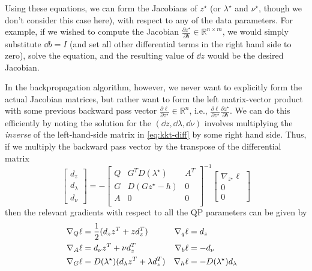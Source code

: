 Using these equations, we can form the Jacobians of $z^\star$ (or
$\lambda^\star$ and $\nu^\star$, though we don't consider this case here), with
respect to any of the data parameters.  For example, if we wished to compute the
Jacobian $\frac{\partial z^\star}{\partial b} \in \mathbb{R}^{n \times m}$, we
would simply substitute $\dd b = I$ (and set all other differential terms in
the right hand side to zero), solve the equation, and the resulting value of
$\dd z$ would be the desired Jacobian.

In the backpropagation algorithm, however, we never want to explicitly form the
actual Jacobian matrices, but rather want to form the left matrix-vector product
with some previous backward pass vector $\frac{\partial \ell}{\partial z^\star}
    \in \mathbb{R}^n$, i.e., $\frac{\partial \ell}{\partial z^\star} \frac {\partial
        z^\star}{\partial b}$.   We can do this efficiently by noting the
solution for the $(\dd z, \dd \lambda, \dd \nu)$ involves multiplying the \emph
{inverse} of the left-hand-side matrix in \eqref{eq:kkt-diff} by some right hand
side.  Thus, if we multiply the backward pass vector by the transpose of the
differential matrix
\begin{equation}
    \label{eq-d-def}
    \begin{bmatrix}
        d_z \\ d_\lambda \\ d_\nu
    \end{bmatrix}
    =
    -
    \begin{bmatrix}
        Q & G^T D(\lambda^\star) & A^T \\
        G & D(Gz^\star-h)        & 0   \\
        A & 0                    & 0   \\
    \end{bmatrix}^{-1}
    \begin{bmatrix}
        \nabla_{z^\star}\ell \\ 0 \\ 0
    \end{bmatrix}
\end{equation}
then the relevant gradients with respect to all the QP parameters can be given by
\begin{equation}
    \hspace{-4mm}
    \begin{aligned}
        \nabla_Q \ell & = \frac{1}{2}(d_z z^T + zd_z^T)
                      & \nabla_q \ell                                     & = d_z                         \\
        \nabla_A \ell & = d_\nu z^T + \nu d_z^T
                      & \nabla_b \ell                                     & = -d_\nu                      \\
        \nabla_G \ell & = D(\lambda^\star)(d_\lambda z^T + \lambda d_z^T)
                      & \nabla_h \ell                                     & = -D(\lambda^\star) d_\lambda
    \end{aligned}
    \label{eq:grads}
\end{equation}
